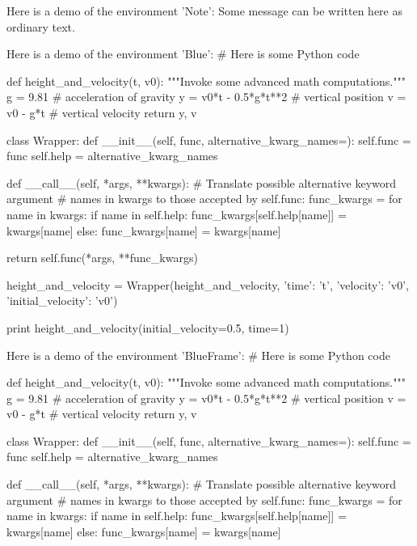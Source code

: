 \noindent
Here is a demo of the environment 'Note':
Some message can be written here as ordinary
text.


\noindent
Here is a demo of the environment 'Blue':
# Here is some Python code

def height_and_velocity(t, v0):
    """Invoke some advanced math computations."""
    g = 9.81                  # acceleration of gravity
    y = v0*t - 0.5*g*t**2     # vertical position
    v = v0 - g*t              # vertical velocity
    return y, v

class Wrapper:
    def __init__(self, func, alternative_kwarg_names={}):
        self.func = func
        self.help = alternative_kwarg_names

    def __call__(self, *args, **kwargs):
        # Translate possible alternative keyword argument
        # names in kwargs to those accepted by self.func:
        func_kwargs = {}
        for name in kwargs:
            if name in self.help:
                func_kwargs[self.help[name]] = kwargs[name]
            else:
                func_kwargs[name] = kwargs[name]

        return self.func(*args, **func_kwargs)

height_and_velocity = Wrapper(height_and_velocity,
                              {'time': 't',
                               'velocity': 'v0',
                               'initial_velocity': 'v0'})

print height_and_velocity(initial_velocity=0.5, time=1)


\noindent
Here is a demo of the environment 'BlueFrame':
# Here is some Python code

def height_and_velocity(t, v0):
    """Invoke some advanced math computations."""
    g = 9.81                  # acceleration of gravity
    y = v0*t - 0.5*g*t**2     # vertical position
    v = v0 - g*t              # vertical velocity
    return y, v

class Wrapper:
    def __init__(self, func, alternative_kwarg_names={}):
        self.func = func
        self.help = alternative_kwarg_names

    def __call__(self, *args, **kwargs):
        # Translate possible alternative keyword argument
        # names in kwargs to those accepted by self.func:
        func_kwargs = {}
        for name in kwargs:
            if name in self.help:
                func_kwargs[self.help[name]] = kwargs[name]
            else:
                func_kwargs[name] = kwargs[name]

